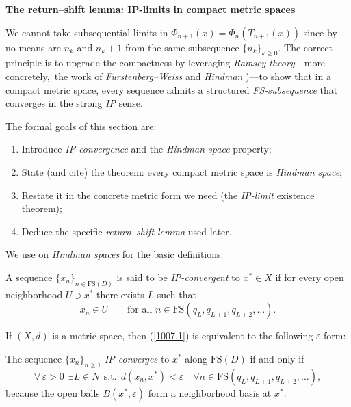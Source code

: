 \documentclass[onecolumn]{article}
\newtheorem{definition}[theorem]{Definition}
\let\olddefinition\definition
\let\endolddefinition\enddefinition
\renewenvironment{definition}{\olddefinition\normalfont}{\endolddefinition}
\begin{document}
\begin{flushleft}
\textbf{The return--shift lemma: IP-limits in compact metric spaces}
\end{flushleft}

We cannot take subsequential limits in $\Phi _{n+1}(x)=\Phi _{n}(T_{n+1}(x))$
since by no means are $n_{k}$ and $n_{k}+1$ from the same subsequence $%
\{n_{k}\}_{k\geq 0}$. The correct principle is to upgrade the compactness by
leveraging \textit{Ramsey theory}---more concretely,\textit{\ }the work of 
\textit{Furstenberg--Weiss} \cite{[58]} and \textit{Hindman }\cite{[57]}%
)---to show that in a compact metric space, every sequence admits a
structured \textit{FS-subsequence} that converges in the strong \textit{IP}
sense.

The formal goals of this section are:

\begin{enumerate}
\item Introduce \textit{IP-convergence} and the \textit{Hindman space}
property;

\item State (and cite) the theorem: every compact metric space is \textit{%
Hindman space};

\item Restate it in the concrete metric form we need (the \textit{IP-limit}
existence theorem);

\item Deduce the specific \textit{return--shift lemma} used later.
\end{enumerate}

We use \cite{[55]} on \textit{Hindman spaces} for the basic definitions.

\begin{definition}
\label{IP-convergence1} A sequence $\{x_{n}\}_{n\in \mathrm{FS}(D)}$ is said
to be \textit{IP-convergent} to $x^{\ast }\in X$ if for every open
neighborhood $U\ni x^{\ast }$ there exists $L$ such that 
\begin{equation}
x_{n}\in U\qquad \text{for all }n\in \mathrm{FS}(q_{L},q_{L+1},q_{L+2},\dots
).  \label{1007.1}
\end{equation}
\end{definition}

If $(X,d)$ is a metric space, then (\ref{1007.1}) is equivalent to the
following $\varepsilon $-form:

\begin{definition}
\label{IP-convergence2}The sequence $\{x_{n}\}_{n\geq 1}$ \textit{%
IP-converges} to $x^{\ast }$ along $\mathrm{FS}(D)$ if and only if 
\begin{equation}
\forall \,\varepsilon >0\ \ \exists L\in N\ \ \text{s.t.}\ \ d(x_{n},x^{\ast
})<\varepsilon \quad \forall n\in \mathrm{FS}(q_{L},q_{L+1},q_{L+2},\dots ),
\label{1007}
\end{equation}%
because the open balls $B(x^{\ast },\varepsilon )$ form a neighborhood basis
at $x^{\ast }$.
\end{definition}
\end{document}
